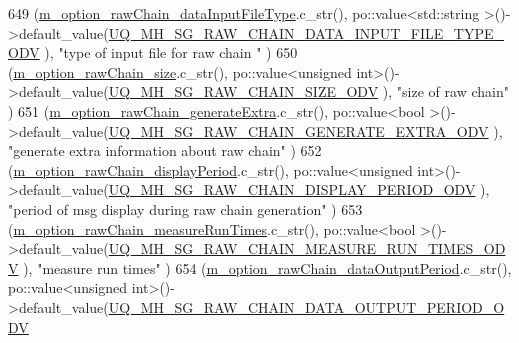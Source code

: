 \begin{DoxyCode}
649     (\hyperlink{class_q_u_e_s_o_1_1_metropolis_hastings_s_g_options_a1e84e51f68d6be34fa1975950136a6b5}{m\_option\_rawChain\_dataInputFileType}.c\_str(),                 
      po::value<std::string >()->default\_value(\hyperlink{_metropolis_hastings_s_g_options_8h_af0e0783c36d4e6c0f791343418518ebf}{UQ\_MH\_SG\_RAW\_CHAIN\_DATA\_INPUT\_FILE\_TYPE\_ODV}
                        ), \textcolor{stringliteral}{"type of input file for raw chain "}                          )
650     (\hyperlink{class_q_u_e_s_o_1_1_metropolis_hastings_s_g_options_af9f6ac21012af90a790e855ad78485e2}{m\_option\_rawChain\_size}.c\_str(),                              po::value<unsigned
       int>()->default\_value(\hyperlink{_metropolis_hastings_s_g_options_8h_a455df8cb3f749964def740f73227205d}{UQ\_MH\_SG\_RAW\_CHAIN\_SIZE\_ODV}                                
        ), \textcolor{stringliteral}{"size of raw chain"}                                          )
651     (\hyperlink{class_q_u_e_s_o_1_1_metropolis_hastings_s_g_options_a9f4213c0fc6f0cf26eb103c78defc0ae}{m\_option\_rawChain\_generateExtra}.c\_str(),                     
      po::value<bool        >()->default\_value(\hyperlink{_metropolis_hastings_s_g_options_8h_a27bbd21c541a1a84270ce23b292cd635}{UQ\_MH\_SG\_RAW\_CHAIN\_GENERATE\_EXTRA\_ODV}   
                           ), \textcolor{stringliteral}{"generate extra information about raw chain"}                 )
652     (\hyperlink{class_q_u_e_s_o_1_1_metropolis_hastings_s_g_options_aa898db5d9a9541c71b727817f1fb443f}{m\_option\_rawChain\_displayPeriod}.c\_str(),                     
      po::value<unsigned int>()->default\_value(\hyperlink{_metropolis_hastings_s_g_options_8h_ae37cce3b662f1c3b6e84d282c41a51a2}{UQ\_MH\_SG\_RAW\_CHAIN\_DISPLAY\_PERIOD\_ODV}   
                           ), \textcolor{stringliteral}{"period of msg display during raw chain generation"}          )
653     (\hyperlink{class_q_u_e_s_o_1_1_metropolis_hastings_s_g_options_aa0700b39e52408944717b283e0e87607}{m\_option\_rawChain\_measureRunTimes}.c\_str(),                   
      po::value<bool        >()->default\_value(\hyperlink{_metropolis_hastings_s_g_options_8h_a980135370984a2685799c2e4fbda6585}{UQ\_MH\_SG\_RAW\_CHAIN\_MEASURE\_RUN\_TIMES\_ODV}
                           ), \textcolor{stringliteral}{"measure run times"}                                          )
654     (\hyperlink{class_q_u_e_s_o_1_1_metropolis_hastings_s_g_options_a60d3d3f6d9bebd55f80e609ceb2fc4db}{m\_option\_rawChain\_dataOutputPeriod}.c\_str(),                  
      po::value<unsigned int>()->default\_value(\hyperlink{_metropolis_hastings_s_g_options_8h_af23b7b773a696e3392ba2509803f7011}{UQ\_MH\_SG\_RAW\_CHAIN\_DATA\_OUTPUT\_PERIOD\_ODV}

\end{DoxyCode}
